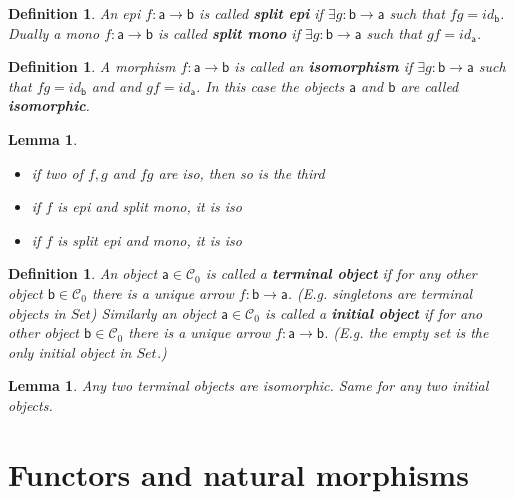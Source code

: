 \documentclass{article}
\newcommand{\cat}[1]{\mathcal{#1}} %
\newcommand{\cato}[1]{\cat{#1}_0} %
\newcommand{\ob}[1]{\mathsf{#1}} %
\newtheorem{lemma}[theorem]{Lemma}
\newtheorem{definition}[theorem]{Definition}
\begin{document}
\begin{definition}
	An epi $f: \ob{a} \rightarrow \ob{b}$ is called \textbf{split epi} if $\exists g: \ob{b} \rightarrow \ob{a}$ such that $fg = id_{\ob{b}}$.
	Dually a mono $f: \ob{a} \rightarrow \ob{b}$ is called \textbf{split mono} if $\exists g: \ob{b} \rightarrow \ob{a}$ such that $gf = id_{\ob{a}}$.
\end{definition}

\begin{definition}
	A morphism $f: \ob{a} \rightarrow \ob{b}$ is called an \textbf{isomorphism} if $\exists g: \ob{b} \rightarrow \ob{a}$ such that $fg = id_{\ob{b}}$ and and $gf = id_{\ob{a}}$.
	In this case the objects $\ob{a}$ and $\ob{b}$ are called \textbf{isomorphic}.
\end{definition}

\begin{lemma}
	\begin{itemize}
		\item if two of $f, g$ and $fg$ are iso, then so is the third
		\item if $f$ is epi and split mono, it is iso
		\item if $f$ is split epi and mono, it is iso
	\end{itemize}
\end{lemma}

\begin{definition}
	An object $\ob{a} \in \cato{C}$ is called a \textbf{terminal object} if for any other object $\ob{b} \in \cato{C}$ there is a unique arrow $f: \ob{b} \rightarrow \ob{a}$.
	(E.g. singletons are terminal objects in $Set$) Similarly an object $\ob{a} \in \cato{C}$ is called a \textbf{initial object} if for ano other object $\ob{b} \in \cato{C}$ there is a unique arrow $f: \ob{a} \rightarrow \ob{b}$.
	(E.g. the empty set is the only initial object in $Set$.)
\end{definition}

\begin{lemma}
	Any two terminal objects are isomorphic. Same for any two initial objects.
\end{lemma}





\section{Functors and natural morphisms}
\end{document}
